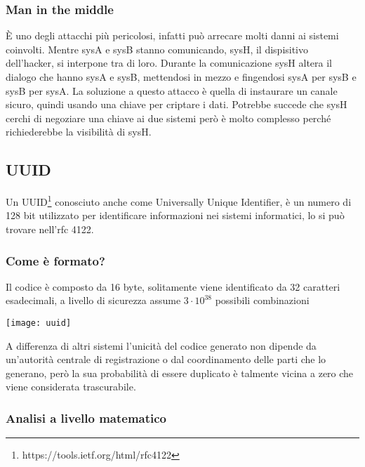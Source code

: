 \subsubsection{Man in the middle}
\hspace{\parindent}È uno degli attacchi più pericolosi, infatti può arrecare molti danni ai sistemi coinvolti. Mentre sysA e sysB stanno comunicando, sysH, il dispisitivo dell'hacker, si interpone tra di loro. Durante la comunicazione sysH altera il dialogo che hanno sysA e sysB, mettendosi in mezzo e fingendosi sysA per sysB e sysB per sysA. La soluzione a questo attacco è quella di instaurare un canale sicuro, quindi usando una chiave per criptare i dati. 
Potrebbe succede che sysH cerchi di negoziare una chiave ai due sistemi però è molto complesso perché richiederebbe la visibilità di sysH.

\subsection{UUID}
\hspace{\parindent}Un UUID\footnote{https://tools.ietf.org/html/rfc4122} conosciuto anche come Universally Unique Identifier, è un numero di 128 bit utilizzato per identificare informazioni nei sistemi informatici, lo si può trovare nell'rfc 4122.
\subsubsection{Come è formato?}
\hspace{\parindent}Il codice è composto da 16 byte, solitamente viene identificato da 32 caratteri esadecimali, a livello di sicurezza assume $ 3 \cdot 10^{38}$ possibili combinazioni
\begin{center}
\texttt{[image: uuid]}
\end{center}
A differenza di altri sistemi l'unicità del codice generato non dipende da un'autorità centrale di registrazione o dal coordinamento delle parti che lo generano, però la sua probabilità di essere duplicato è talmente vicina a zero che viene considerata trascurabile.

\subsubsection{Analisi a livello matematico}

